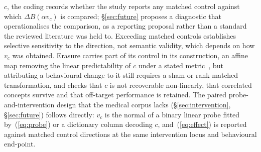 $c$, the coding records whether the study reports any matched control against which $\Delta B(\alpha v_c)$
is compared; \S\ref{sec:future} proposes a diagnostic that operationalises the comparison, as a reporting
proposal rather than a standard the reviewed literature was held to. Exceeding matched controls establishes
selective sensitivity to the direction, not semantic validity, which depends on how $v_c$ was obtained.
Erasure carries part of its control in its construction, an affine map removing the linear predictability
of $c$ under a stated metric~\cite{belrose2023leace}, but attributing a behavioural change to it still
requires a sham or rank-matched transformation, and checks that $c$ is not recoverable non-linearly, that
correlated concepts survive and that off-target performance is retained. The paired probe-and-intervention design that the medical corpus lacks (\S\ref{sec:intervention}, \S\ref{sec:future}) follows directly: $v_c$ is the normal of a binary linear probe fitted by~(\ref{eq:probe}) or a dictionary column decoding $c$, and~(\ref{eq:effect}) is reported against matched control directions at the same intervention locus and behavioural end-point.

